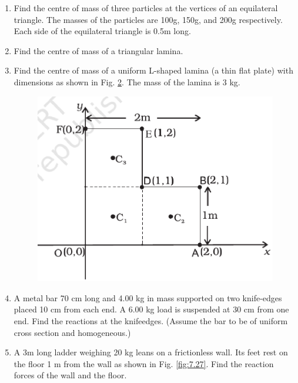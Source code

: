 \begin{enumerate}[label=\arabic*.,ref=\thesubsection.\theenumi]
\begin{figure}[!ht]
\caption{}
\label{fig:6.17}
\end{figure}
\item Find the centre of mass of three particles at the vertices of an equilateral triangle. The masses of the particles are 100g, 150g, and 200g respectively. Each side of the equilateral triangle is 0.5m long.
\item Find the centre of mass of a triangular lamina.
\item Find the centre of mass of a uniform L-shaped lamina (a thin flat plate) with dimensions as shown in Fig. \ref{fig:7.11}. The mass of the lamina is 3 kg.
\begin{figure}[!ht]
\includegraphics[width=\columnwidth]{./figs/11-1/7/7.11.eps}
\caption{}
\label{fig:7.11}
\end{figure}
\item A metal bar 70 cm long and 4.00 kg in mass supported on two knife-edges placed 10 cm from each end. A 6.00 kg load is suspended at 30 cm from one end. Find the reactions at the knifeedges. (Assume the bar to be of uniform cross section and homogeneous.)
\item A 3m long ladder weighing 20 kg leans on a frictionless wall. Its feet rest on the floor 1 m from the wall as shown in Fig. \ref{fig:7.27}. Find the reaction forces of the wall and the floor.
\begin{figure}[!ht]

\end{figure}
\end{enumerate}
